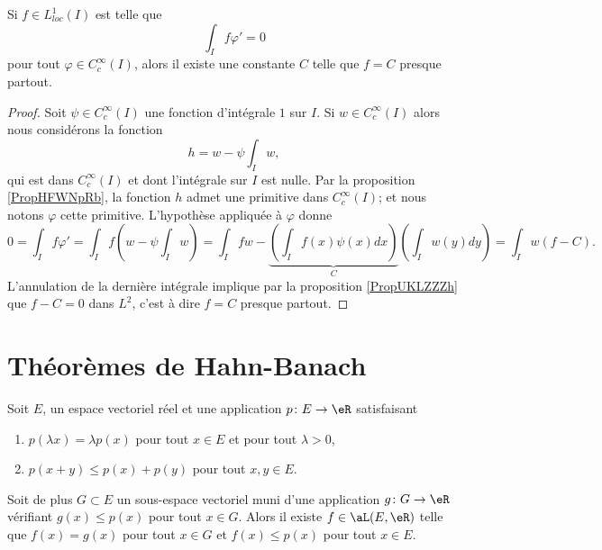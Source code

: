 \begin{proposition} \label{PropLGoLtcS}
    Si \( f\in L^1_{loc}(I)\) est telle que
    \begin{equation}
        \int_If\varphi'=0
    \end{equation}
    pour tout \( \varphi\in  C^{\infty}_c(I)\), alors il existe une constante \( C\) telle que \( f=C\) presque partout.
\end{proposition}

\begin{proof}
    Soit \( \psi\in C^{\infty}_c(I)\) une fonction d'intégrale \( 1\) sur \( I\). Si \( w\in C^{\infty}_c(I)\) alors nous considérons la fonction
    \begin{equation}
        h=w-\psi\int_Iw,
    \end{equation}
    qui est dans \(  C^{\infty}_c(I)\) et dont l'intégrale sur \( I\) est nulle. Par la proposition \ref{PropHFWNpRb}, la fonction \( h\) admet une primitive dans \(  C^{\infty}_c(I)\); et nous notons \( \varphi\) cette primitive. L'hypothèse appliquée à \( \varphi\) donne
    \begin{equation}
        0=\int_If\varphi'=\int_If\left( w-\psi\int_Iw \right)=\int_Ifw-\underbrace{\left( \int_If(x)\psi(x)dx \right)}_C\left( \int_Iw(y)dy \right)=\int_Iw(f-C).
    \end{equation}
    L'annulation de la dernière intégrale implique par la proposition \ref{PropUKLZZZh} que \( f-C=0\) dans \( L^2\), c'est à dire \( f=C\) presque partout.
\end{proof}


\section{Théorèmes de Hahn-Banach}

\begin{theorem}
    Soit \( E\), un espace vectoriel réel et une application \( p\colon E\to \eR\) satisfaisant
    \begin{enumerate}
        \item
            \( p(\lambda x)=\lambda p(x)\) pour tout \( x\in E\) et pour tout \( \lambda>0\),
        \item
            \( p(x+y)\leq p(x)+p(y)\) pour tout \( x,y\in E\).
    \end{enumerate}
    Soit de plus \( G\subset E\) un sous-espace vectoriel muni d'une application \( g\colon G\to \eR\) vérifiant \( g(x)\leq p(x)\) pour tout \( x\in G\). Alors il existe \( f\in\aL(E,\eR)\) telle que \( f(x)=g(x)\) pour tout \( x\in G\) et \( f(x)\leq p(x)\) pour tout \( x\in E\).
\end{theorem}


